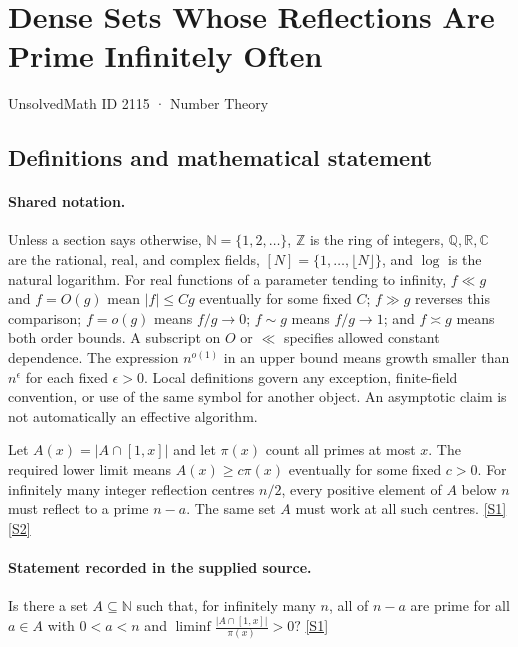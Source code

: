 \documentclass[11pt,a4paper]{article}
\newcommand{\N}{\mathbb{N}}
\newcommand{\Z}{\mathbb{Z}}
\newcommand{\Q}{\mathbb{Q}}
\newcommand{\R}{\mathbb{R}}
\newcommand{\C}{\mathbb{C}}
\newcommand{\sref}[2]{\hyperlink{source:#1:#2}{[S#2]}}
\begin{document}

\setcounter{section}{2114}

\section{Dense Sets Whose Reflections Are Prime Infinitely Often}\label{2115}

{\small\sffamily UnsolvedMath ID 2115 · Number Theory}

\subsection{Definitions and mathematical statement}

\paragraph{Shared notation.}Unless a section says otherwise, $\N=\{1,2,\ldots\}$,
$\Z$ is the ring of integers, $\Q,\R,\C$ are the rational, real, and complex
fields, $[N]=\{1,\ldots,\lfloor N\rfloor\}$, and $\log$ is the natural
logarithm. For real functions of a parameter tending to infinity,
$f\ll g$ and $f=O(g)$ mean $|f|\leq Cg$ eventually for some fixed $C$;
$f\gg g$ reverses this comparison; $f=o(g)$ means $f/g\to0$;
$f\sim g$ means $f/g\to1$; and $f\asymp g$ means both order bounds.
A subscript on $O$ or $\ll$ specifies allowed constant dependence.
The expression $n^{o(1)}$ in an upper bound means growth smaller than
$n^\epsilon$ for each fixed $\epsilon>0$. Local definitions govern any
exception, finite-field convention, or use of the same symbol for another
object. An asymptotic claim is not automatically an effective algorithm.



Let $A(x)=|A\cap[1,x]|$ and let $\pi(x)$ count all primes at most $x$. The required lower limit means $A(x)\geq c\pi(x)$ eventually for some fixed $c>0$. For infinitely many integer reflection centres $n/2$, every positive element of $A$ below $n$ must reflect to a prime $n-a$. The same set $A$ must work at all such centres. \sref{2115}{1} \sref{2115}{2}

\paragraph{Statement recorded in the supplied source.}
Is there a set $A\subseteq \mathbb{N}$ such that, for infinitely many $n$, all of $n-a$ are prime for all $a\in A$ with $0<a<n$ and $ \liminf\frac{\lvert A\cap [1,x]\rvert}{\pi(x)}>0? $ \sref{2115}{1}
\end{document}
